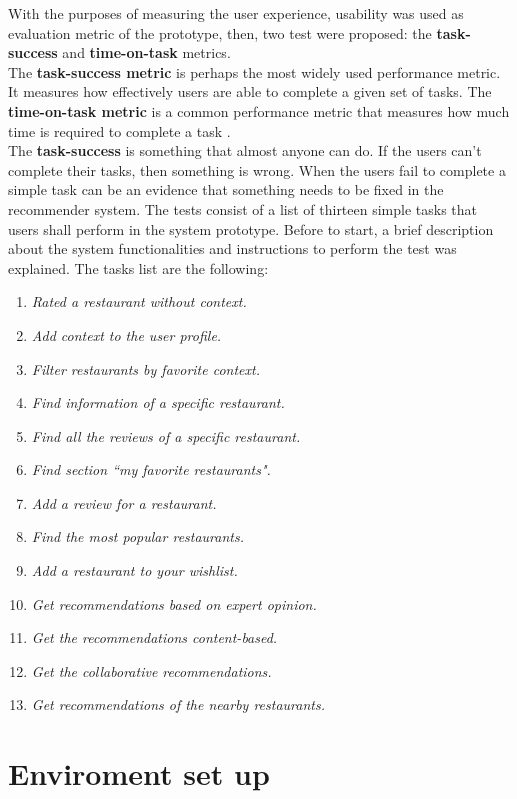 With the purposes of measuring the user experience, usability was used
as evaluation metric of the prototype, then, two test were proposed: the
\textbf{task-success} and \textbf{time-on-task} metrics. \\ 
The \textbf{task-success metric} is perhaps the most widely used
performance metric. It measures how effectively users are able to
complete a given set of tasks.  The \textbf{time-on-task metric} is a
common performance metric that measures how much time is required to
complete a task  \cite{albert2013measuring}.\\
The \textbf{task-success} is something that almost anyone can do. 
If the users can't complete their tasks, then something is wrong. 
When the users fail to complete a simple task can be an evidence 
that something needs to be fixed in the recommender system. 
The tests consist of a list of thirteen simple tasks that users shall
perform in the system prototype. Before to start, a brief description
about the system functionalities and instructions to perform the test
was explained. The tasks list are the following:
\begin{enumerate} 
\item \textit{Rated a restaurant without context.}
\item \textit{Add context to the user profile.}
\item \textit{Filter restaurants by favorite context.}
\item \textit{Find information of a specific restaurant.}
\item \textit{Find all the reviews of a specific restaurant.} 
\item \textit{Find section ``my favorite restaurants".}
\item \textit{Add a review for a restaurant.}
\item \textit{Find the most popular restaurants.}
\item \textit{Add a restaurant to your wishlist.}
\item \textit{Get recommendations based on expert opinion.} 
\item \textit{Get the recommendations content-based.}
\item \textit{Get the collaborative recommendations.}
\item \textit{Get recommendations of the nearby restaurants.}
\end{enumerate} 

\section{Enviroment set up}

